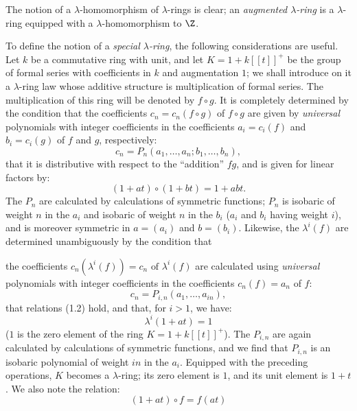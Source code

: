 The notion of a $\lambda$-homomorphism of $\lambda$-rings is clear; an \emph{augmented $\lambda$-ring} is a $\lambda$-ring equipped with a $\lambda$-homomorphism to $\Z$.

To define the notion of a \emph{special $\lambda$-ring}, the following considerations are useful. Let $k$ be a commutative ring with unit, and let $K=1+k[[t]]^+$ be the group of formal series with coefficients in $k$ and augmentation $1$; we shall introduce on it a $\lambda$-ring law whose additive structure is multiplication of formal series. The multiplication of this ring will be denoted by $f\circ g$. It is completely determined by the condition that the coefficients $c_n=c_n(f\circ g)$ of $f\circ g$ are given by \emph{universal} polynomials with integer coefficients in the coefficients $a_i=c_i(f)$ and $b_i=c_i(g)$ of $f$ and $g$, respectively:
\begin{equation}\tag{1.6}
c_n=P_n(a_1,\ldots,a_n;b_1,\ldots,b_n),
\end{equation}
that it is distributive with respect to the ``addition'' $fg$, and is given for linear factors by:
\begin{equation}\tag{1.7}
(1+at)\circ(1+bt)=1+abt.
\end{equation}
The $P_n$ are calculated by calculations of symmetric functions; $P_n$ is isobaric of weight $n$ in the $a_i$ and isobaric of weight $n$ in the $b_i$ ($a_i$ and $b_i$ having weight $i$), and is moreover symmetric in $a=(a_i)$ and $b=(b_i)$. Likewise, the $\lambda^i(f)$ are determined unambiguously by the condition that

the coefficients $c_n(\lambda^i(f))=c_n\text{ of }\lambda^i(f)$ are calculated using \emph{universal} polynomials with integer coefficients in the coefficients $c_n(f)=a_n$ of $f$:
\begin{equation}\tag{1.8}
c_n=P_{i,n}(a_1,\ldots,a_{in}),
\end{equation}
that relations (1.2) hold, and that, for $i>1$, we have:
\begin{equation}\tag{1.9}
\lambda^i(1+at)=1
\end{equation}
($1$ is the zero element of the ring $K=1+k[[t]]^+$). The $P_{i,n}$ are again calculated by calculations of symmetric functions, and we find that $P_{i,n}$ is an isobaric polynomial of weight $in$ in the $a_i$. Equipped with the preceding operations, $K$ becomes a $\lambda$-ring; its zero element is $1$, and its unit element is $1+t$. We also note the relation:
\begin{equation}\tag{1.7 bis}
(1+at)\circ f=f(at)
\end{equation}

